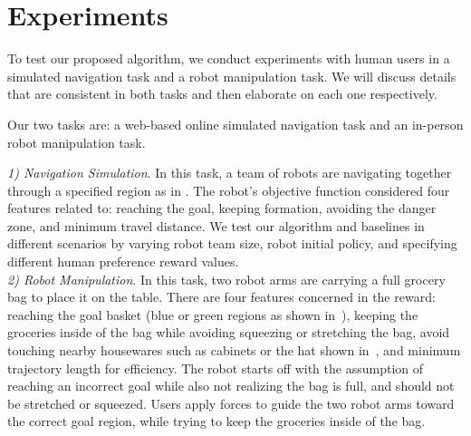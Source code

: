 

\section{Experiments}
\label{sec:user_study}

To test our proposed algorithm, we conduct experiments with human users in a simulated navigation task and a robot manipulation task. We will discuss details that are consistent in both tasks and then elaborate on each one respectively.

\smallskip
{} Our two tasks are: a web-based online simulated navigation task and an in-person robot manipulation task.


\noindent\textit{1) Navigation Simulation}. 
In this task, a team of robots are navigating together through a specified region as in . The robot’s objective function considered four features related to: reaching the goal, keeping formation, avoiding the danger zone, and minimum travel distance. We test our algorithm and baselines in different scenarios by varying robot team size, robot initial policy, and specifying different human preference reward values. 
\\
\noindent\textit{2) Robot Manipulation}. In this task, two robot arms are carrying a full grocery bag to place it on the table. There are four features concerned in the reward: reaching the goal basket (blue or green regions as shown in~), keeping the groceries inside of the bag while avoiding squeezing or stretching the bag, avoid touching nearby housewares such as cabinets or the hat shown in~, and minimum trajectory length for efficiency.
The robot starts off with the assumption of reaching an incorrect goal while also not realizing the bag is full, and should not be stretched or squeezed. Users apply forces to guide the two robot arms toward the correct goal region, while trying to keep the groceries inside of the bag. 


